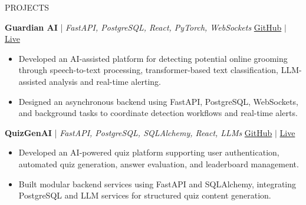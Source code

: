 \documentclass{resume} %
\begin{document}
\begin{rSection}{PROJECTS}
\begin{itemize}
\end{itemize}

\vspace{-0.1em}


\textbf{Guardian AI} | {\small\textit{FastAPI, PostgreSQL, React, PyTorch, WebSockets}} \hfill
\href{https://github.com/AnniiGCP/Guardian-AI}{GitHub} $|$
\href{<LIVE_URL>}{Live} \\

\vspace{-1.2em}

\begin{itemize}
\itemsep -3pt

\item Developed an AI-assisted platform for detecting potential online grooming through speech-to-text processing, transformer-based text classification, LLM-assisted analysis and real-time alerting.

\item Designed an asynchronous backend using FastAPI, PostgreSQL, WebSockets, and background tasks to coordinate detection workflows and real-time alerts.

\end{itemize}

\vspace{-0.1em}


\textbf{QuizGenAI} | {\small\textit{FastAPI, PostgreSQL, SQLAlchemy, React, LLMs}} \hfill
\href{https://github.com/AnniiGCP/QuizGenAI}{GitHub} $|$
\href{<LIVE_URL>}{Live} \\

\vspace{-1.2em}

\begin{itemize}
\itemsep -3pt

\item Developed an AI-powered quiz platform supporting user authentication, automated quiz generation, answer evaluation, and leaderboard management.

\item Built modular backend services using FastAPI and SQLAlchemy, integrating PostgreSQL and LLM services for structured quiz content generation.

\end{itemize}

\end{rSection}
\end{document}
